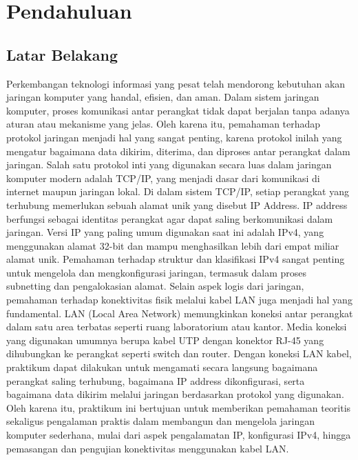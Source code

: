 \section{Pendahuluan}
\subsection{Latar Belakang}
Perkembangan teknologi informasi yang pesat telah mendorong kebutuhan akan jaringan komputer yang handal, efisien, dan aman. Dalam sistem jaringan komputer, proses komunikasi antar perangkat tidak dapat berjalan tanpa adanya aturan atau mekanisme yang jelas. Oleh karena itu, pemahaman terhadap protokol jaringan menjadi hal yang sangat penting, karena protokol inilah yang mengatur bagaimana data dikirim, diterima, dan diproses antar perangkat dalam jaringan. Salah satu protokol inti yang digunakan secara luas dalam jaringan komputer modern adalah TCP/IP, yang menjadi dasar dari komunikasi di internet maupun jaringan lokal. Di dalam sistem TCP/IP, setiap perangkat yang terhubung memerlukan sebuah alamat unik yang disebut IP Address. IP address berfungsi sebagai identitas perangkat agar dapat saling berkomunikasi dalam jaringan. Versi IP yang paling umum digunakan saat ini adalah IPv4, yang menggunakan alamat 32-bit dan mampu menghasilkan lebih dari empat miliar alamat unik. Pemahaman terhadap struktur dan klasifikasi IPv4 sangat penting untuk mengelola dan mengkonfigurasi jaringan, termasuk dalam proses subnetting dan pengalokasian alamat. Selain aspek logis dari jaringan, pemahaman terhadap konektivitas fisik melalui kabel LAN juga menjadi hal yang fundamental. LAN (Local Area Network) memungkinkan koneksi antar perangkat dalam satu area terbatas seperti ruang laboratorium atau kantor. Media koneksi yang digunakan umumnya berupa kabel UTP dengan konektor RJ-45 yang dihubungkan ke perangkat seperti switch dan router. Dengan koneksi LAN kabel, praktikum dapat dilakukan untuk mengamati secara langsung bagaimana perangkat saling terhubung, bagaimana IP address dikonfigurasi, serta bagaimana data dikirim melalui jaringan berdasarkan protokol yang digunakan. Oleh karena itu, praktikum ini bertujuan untuk memberikan pemahaman teoritis sekaligus pengalaman praktis dalam membangun dan mengelola jaringan komputer sederhana, mulai dari aspek pengalamatan IP, konfigurasi IPv4, hingga pemasangan dan pengujian konektivitas menggunakan kabel LAN.


